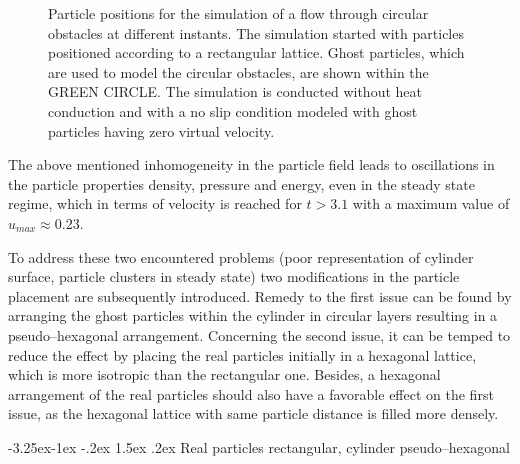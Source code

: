 \documentclass{report}
\makeatletter
\renewcommand\paragraph{\@startsection{paragraph}{4}{\z@}%
  {-3.25ex\@plus -1ex \@minus -.2ex}%
  {1.5ex \@plus .2ex}%
  {\normalfont\normalsize\bfseries}}
\makeatother
\begin{document}
\begin{figure}[h]
{}

\caption[particle positions for Porosities]{Particle positions for the simulation of a flow through circular obstacles at different instants. The simulation started with particles positioned according to a rectangular lattice. Ghost particles, which are used to model the circular obstacles, are shown within the GREEN CIRCLE. The simulation is conducted without heat conduction and with a no slip condition modeled with ghost particles having zero virtual velocity.}

\end{figure}

The above mentioned inhomogeneity in the particle field leads to oscillations in the particle properties density, pressure and energy, even in the steady state regime, which in terms of velocity is reached for $t>3.1$ with a maximum value of $u_\mathit{max}\approx 0.23$. 

To address these two encountered problems (poor representation of cylinder surface, particle clusters in steady state) two modifications in the particle placement are subsequently introduced. Remedy to the first issue can be found by arranging the ghost particles within the cylinder in circular layers resulting in a pseudo--hexagonal arrangement. Concerning the second issue, it can be temped to reduce the effect by placing the real particles initially in a hexagonal lattice, which is more isotropic than the rectangular one. Besides, a hexagonal arrangement of the real particles should also have a favorable effect on the first issue, as the hexagonal lattice with same particle distance is filled more densely.

\paragraph{Real particles rectangular, cylinder pseudo--hexagonal}
\end{document}
